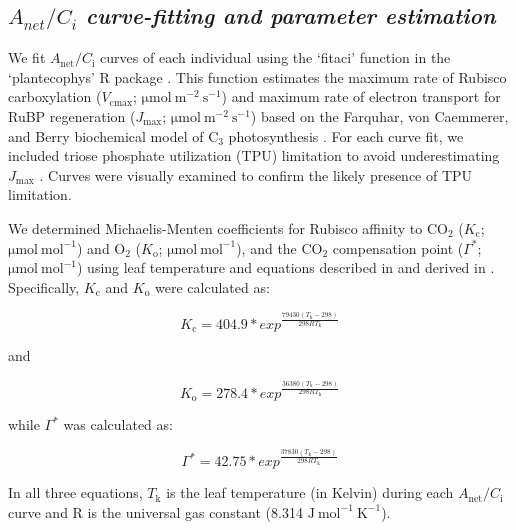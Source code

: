 \subsection{$A_{net}/C_i$ \textit{curve-fitting and parameter estimation}}
We fit $A_\mathrm{net}/C_\mathrm{i}$ curves of each individual using the ‘fitaci’ function in the ‘plantecophys’ R package . This function estimates the maximum rate of Rubisco carboxylation ($V_\mathrm{cmax}$; $\mathrm{\mu mol\ m^{-2}\ s^{-1}}$) and maximum rate of electron transport for RuBP regeneration ($J_\mathrm{max}$; $\mathrm{\mu mol\ m^{-2}\ s^{-1}}$) based on the Farquhar, von Caemmerer, and Berry biochemical model of C$_{3}$ photosynthesis . For each curve fit, we included triose phosphate utilization (TPU) limitation to avoid underestimating $J_{\mathrm{max}}$ . Curves were visually examined to confirm the likely presence of TPU limitation. 
    
We determined Michaelis-Menten coefficients for Rubisco affinity to CO$_2$ ($K_\mathrm{c}$; $\mathrm{\mu mol\ mol^{-1}}$) and $\mathrm{O_2}$ ($K_\mathrm{o}$; $\mathrm{\mu mol\ mol^{-1}}$), and the CO$_2$ compensation point ($\Gamma^*$; $\mathrm{\mu mol\ mol^{-1}}$) using leaf temperature and equations described in  and derived in . Specifically, $K_\mathrm{c}$ and $K_\mathrm{o}$ were calculated as:

\begin{equation} \label{eq_2.3}
    K_\mathrm{c}=404.9*exp^{\frac{79430(T_\mathrm{k}-298)}{298RT_\mathrm{k}}}
\end{equation}
    
\noindent and
    
\begin{equation} \label{eq_2.4}
    K_\mathrm{o}=278.4*exp^{\frac{36380(T_\mathrm{k}-298)}{298RT_\mathrm{k}}}
\end{equation}
    
\noindent while $\Gamma^*$ was calculated as:
    
\begin{equation} \label{eq_2.5}
    \Gamma^\mathrm{*}=42.75*exp^{\frac{37830(T_\mathrm{k}-298)}{298RT_\mathrm{k}}}
\end{equation}

\noindent In all three equations, $T_\mathrm{k}$ is the leaf temperature (in Kelvin) during each $A_\mathrm{net}/C_\mathrm{i}$ curve and R is the universal gas constant (8.314 $\mathrm{J\ mol^{-1}\ K^{-1}}$).

